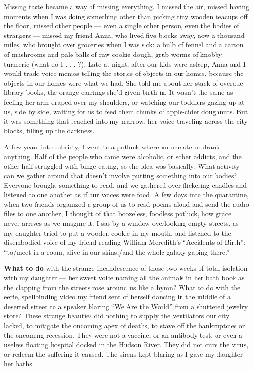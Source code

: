 Missing taste became a way of missing everything. I missed the air,
missed having moments when I was doing something other than picking tiny
wooden teacups off the floor, missed other people --- even a single
other person, even the bodies of strangers --- missed my friend Anna,
who lived five blocks away, now a thousand miles, who brought over
groceries when I was sick: a bulb of fennel and a carton of mushrooms
and pale balls of raw cookie dough, grub worms of knobby turmeric (what
do I . . . ?). Late at night, after our kids were asleep, Anna and I
would trade voice memos telling the stories of objects in our homes,
because the objects in our homes were what we had. She told me about her
stack of overdue library books, the orange earrings she'd given birth
in. It wasn't the same as feeling her arm draped over my shoulders, or
watching our toddlers gazing up at us, side by side, waiting for us to
feed them chunks of apple-cider doughnuts. But it was something that
reached into my marrow, her voice traveling across the city blocks,
filling up the darkness.

A few years into sobriety, I went to a potluck where no one ate or drank
anything. Half of the people who came were alcoholic, or sober addicts,
and the other half struggled with binge eating, so the idea was
basically: What activity can we gather around that doesn't involve
putting something into our bodies? Everyone brought something to read,
and we gathered over flickering candles and listened to one another as
if our voices were food. A few days into the quarantine, when two
friends organized a group of us to read poems aloud and send the audio
files to one another, I thought of that boozeless, foodless potluck, how
grace never arrives as we imagine it. I sat by a window overlooking
empty streets, as my daughter tried to put a wooden cookie in my mouth,
and listened to the disembodied voice of my friend reading William
Meredith's ``Accidents of Birth'': ``to/meet in a room, alive in our
skins,/and the whole galaxy gaping there.''

\textbf{What to do} with the strange incandescence of those two weeks of
total isolation with my daughter --- her sweet voice naming all the
animals in her bath book as the clapping from the streets rose around us
like a hymn? What to do with the eerie, spellbinding video my friend
sent of herself dancing in the middle of a deserted street to a speaker
blaring ``We Are the World'' from a shuttered jewelry store? These
strange beauties did nothing to supply the ventilators our city lacked,
to mitigate the oncoming apex of deaths, to stave off the bankruptcies
or the oncoming recession. They were not a vaccine, or an antibody test,
or even a useless floating hospital docked in the Hudson River. They did
not cure the virus, or redeem the suffering it caused. The sirens kept
blaring as I gave my daughter her baths.

